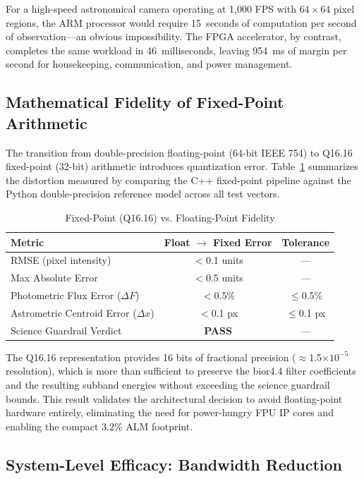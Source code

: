 \documentclass[conference]{IEEEtran}
\begin{document}
For a high-speed astronomical camera operating at 1,000 FPS with $64 \times 64$ pixel regions, the ARM processor would require 15~seconds of computation per second of observation---an obvious impossibility. The FPGA accelerator, by contrast, completes the same workload in 46~milliseconds, leaving 954~ms of margin per second for housekeeping, communication, and power management.

\subsection{Mathematical Fidelity of Fixed-Point Arithmetic}

The transition from double-precision floating-point (64-bit IEEE 754) to Q16.16 fixed-point (32-bit) arithmetic introduces quantization error. Table~\ref{tab:fidelity} summarizes the distortion measured by comparing the C++ fixed-point pipeline against the Python double-precision reference model across all test vectors.

\begin{table}[ht]
\centering
\caption{Fixed-Point (Q16.16) vs. Floating-Point Fidelity}
\label{tab:fidelity}
\begin{tabular}{@{}lcc@{}}
\toprule
\textbf{Metric} & \textbf{Float $\rightarrow$ Fixed Error} & \textbf{Tolerance} \\ \midrule
RMSE (pixel intensity) & $<$0.1 units & --- \\
Max Absolute Error & $<$0.5 units & --- \\
Photometric Flux Error ($\Delta F$) & $<$0.5\% & $\leq$0.5\% \\
Astrometric Centroid Error ($\Delta x$) & $<$0.1 px & $\leq$0.1 px \\
Science Guardrail Verdict & \textbf{PASS} & --- \\ \bottomrule
\end{tabular}
\end{table}

The Q16.16 representation provides 16 bits of fractional precision ($\approx$1.5$\times 10^{-5}$ resolution), which is more than sufficient to preserve the bior4.4 filter coefficients and the resulting subband energies without exceeding the science guardrail bounds. This result validates the architectural decision to avoid floating-point hardware entirely, eliminating the need for power-hungry FPU IP cores and enabling the compact 3.2\% ALM footprint.

\subsection{System-Level Efficacy: Bandwidth Reduction}
\end{document}
